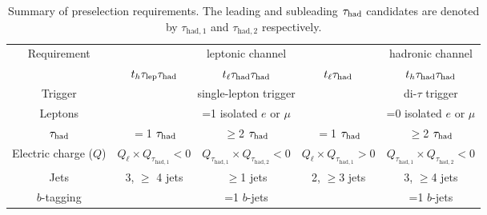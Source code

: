 \begin{table*}[t!]
\caption{\small{Summary of preselection requirements. 
The leading and subleading $\tau_{\mathrm{had}}$ candidates are denoted by $\tau_{\mathrm{had,1}}$ and $\tau_{\mathrm{had,2}}$ respectively.}}
\begin{center}
\begin{tabular}{c|ccc|c}
\toprule\toprule
\multirow{2}{*}{Requirement} &  \multicolumn{3}{c|}{leptonic channel}  & \multicolumn{1}{c}{hadronic channel} \\ 
& $t_h\tau_{\mathrm{lep}} \tau_{\mathrm{had}}$ & $t_{\ell}\tau_{\mathrm{had}} \tau_{\mathrm{had}}$ &  $t_{\ell}\tau_{\mathrm{had}}$ & $t_h\tau_{\mathrm{had}} \tau_{\mathrm{had}}$\\
\midrule
Trigger & \multicolumn{3}{c|}{single-lepton trigger} & di-$\tau$ trigger  \\
Leptons  & \multicolumn{3}{c|}{=1 isolated $e$ or $\mu$}  & =0 isolated $e$ or $\mu$ \\
$\tau_{\mathrm{had}}$  & $=$1 $\tau_{\mathrm{had}}$ & $\geq$2 $\tau_{\mathrm{had}}$ & $=$1 $\tau_{\mathrm{had}}$ & $\geq$2 $\tau_{\mathrm{had}}$ \\
Electric charge ($Q$) & $Q_\ell \times Q_{\tau_{\mathrm{had,1}}} < 0$ & $Q_{\tau_{\mathrm{had,1}}} \times Q_{\tau_{\mathrm{had,2}}} < 0$ & $Q_\ell \times Q_{\tau_{\mathrm{had,1}}} > 0$ & $Q_{\tau_{\mathrm{had,1}}} \times Q_{\tau_{\mathrm{had,2}}} < 0$ \\
Jets  &  3, $\geq$ 4 jets & $\geq$1 jets & 2, $\geq$3 jets & 3, $\geq$4 jets \\
$b$-tagging & \multicolumn{3}{c|}{=1 $b$-jets} & =1 $b$-jets\\
\bottomrule\bottomrule
\end{tabular}
\label{tab:preselection}
\end{center}
\end{table*}
